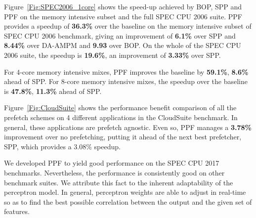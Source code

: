 Figure~\ref{Fig:SPEC2006_1core} shows the speed-up achieved by BOP, SPP and
PPF on the memory intensive subset and the full SPEC CPU 2006 suite. 
PPF provides a speedup of \textbf{36.3\%} over the baseline on the 
memory intensive subset of SPEC CPU
2006 benchmark, giving an improvement of \textbf{6.1\%} over SPP and
\textbf{8.44\%} over DA-AMPM and \textbf{9.93} over BOP. On the whole of 
the SPEC CPU 2006 suite, the speedup is \textbf{19.6\%}, an improvement 
of \textbf{3.33\%} over SPP.

For 4-core memory intensive mixes, PPF improves the baseline by
\textbf{59.1\%}, \textbf{8.6\%} ahead of SPP. For 8-core memory intensive
mixes, the speedup over the baseline is \textbf{47.8\%}, \textbf{11.3\%} ahead
of SPP.

Figure~\ref{Fig:CloudSuite} shows the performance benefit comparison of all
the prefetch schemes on 4 different applications in the CloudSuite benchmark.
In general, these applications are prefetch agnostic. Even so, PPF manages a
\textbf{3.78\%} improvement over no prefetching, putting it ahead of the next
best prefetcher, SPP, which provides a 3.08\% speedup.

We developed PPF to yield good performance on the SPEC CPU 2017 benchmarks.
Nevertheless, the performance is consistently good on other benchmark suites.
We attribute this fact to the inherent adaptability of the perceptron model.
In general, perceptron weights are able to adjust in real-time so as to find
the best possible correlation between the output and the given set of
features.

